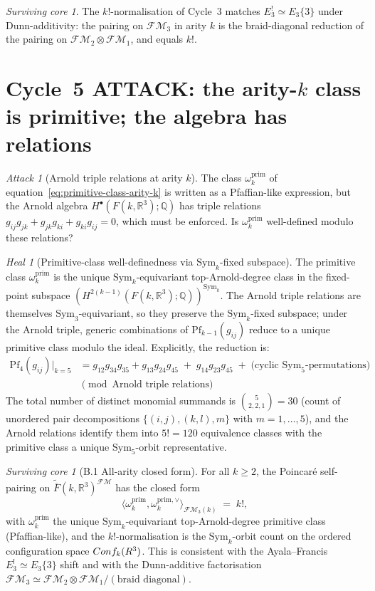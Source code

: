 \documentclass[11pt]{article}
\theoremstyle{definition}
\theoremstyle{remark}
\newtheorem{attack}[theorem]{Attack}
\newtheorem{heal}[theorem]{Heal}
\newtheorem{survivor}[theorem]{Surviving core}
\providecommand{\FMbar}{\overline{F}}
\providecommand{\FM}{\mathcal{FM}}
\providecommand{\FMop}{\mathcal{FM}}
\providecommand{\FM}{\mathrm{FM}}
\providecommand{\RR}{\mathbb{R}}
\providecommand{\QQ}{\mathbb{Q}}
\providecommand{\Sym}{\mathrm{Sym}}
\begin{document}
\begin{survivor}
The $k!$-normalisation of Cycle~$3$ matches $E_3^! \simeq E_3\{3\}$
under Dunn-additivity: the pairing on $\FMop_3$ in arity $k$ is the
braid-diagonal reduction of the pairing on $\FMop_2 \otimes \FMop_1$,
and equals $k!$.
\end{survivor}

\section{Cycle~5 ATTACK: the arity-$k$ class is primitive; the algebra has
relations}

\begin{attack}[Arnold triple relations at arity $k$]
\label{att:b-cycle-5}
The class $\omega_k^{\mathrm{prim}}$ of equation~\eqref{eq:primitive-class-arity-k}
is written as a Pfaffian-like expression, but the Arnold algebra
$H^\bullet(F(k,\RR^3); \QQ)$ has triple relations
$g_{ij}g_{jk} + g_{jk}g_{ki} + g_{ki}g_{ij} = 0$, which must be
enforced. Is $\omega_k^{\mathrm{prim}}$ well-defined modulo these
relations?
\end{attack}

\begin{heal}[Primitive-class well-definedness via $\Sym_k$-fixed subspace]
\label{heal:b-cycle-5}
The primitive class $\omega_k^{\mathrm{prim}}$ is the unique
$\Sym_k$-equivariant top-Arnold-degree class in the fixed-point subspace
$(H^{2(k-1)}(F(k,\RR^3); \QQ))^{\Sym_k}$. The Arnold triple relations
are themselves $\Sym_3$-equivariant, so they preserve the
$\Sym_k$-fixed subspace; under the Arnold triple, generic
combinations of $\mathrm{Pf}_{k-1}(g_{ij})$ reduce to a unique
primitive class modulo the ideal. Explicitly, the reduction is:
\begin{align}
\mathrm{Pf}_4(g_{ij})|_{k = 5}
&= g_{12} g_{34} g_{35} + g_{13} g_{24} g_{45}
 \;+\; g_{14} g_{23} g_{45}
 \;+\; \text{(cyclic $\Sym_5$-permutations)}
\\
& \pmod{\text{Arnold triple relations}}
\end{align}
The total number of distinct monomial summands is $\binom{5}{2,2,1} = 30$
(count of unordered pair decompositions $\{(i,j), (k,l), m\}$ with
$m = 1, \ldots, 5$), and the Arnold relations identify them into
$5! = 120$ equivalence classes with the primitive class a unique
$\Sym_5$-orbit representative.
\end{heal}

\begin{survivor}[B.1 All-arity closed form]
\label{surv:b-all-arity}
For all $k \geq 2$, the Poincar\'e self-pairing on
$\widetilde{\FMbar}(k,\RR^3)^{\FM}$ has the closed form
\[
 \langle \omega_k^{\mathrm{prim}}, \omega_k^{\mathrm{prim},\vee}
 \rangle_{\FMop_3(k)} \;=\; k!,
\]
with $\omega_k^{\mathrm{prim}}$ the unique $\Sym_k$-equivariant
top-Arnold-degree primitive class (Pfaffian-like), and the
$k!$-normalisation is the $\Sym_k$-orbit count on the ordered
configuration space $\Conf_k(\RR^3)$. This is consistent with the
Ayala--Francis $E_3^! \simeq E_3\{3\}$ shift and with the Dunn-additive
factorisation $\FMop_3 \simeq \FMop_2 \otimes \FMop_1 / (\text{braid
diagonal})$.
\end{survivor}
\end{document}
